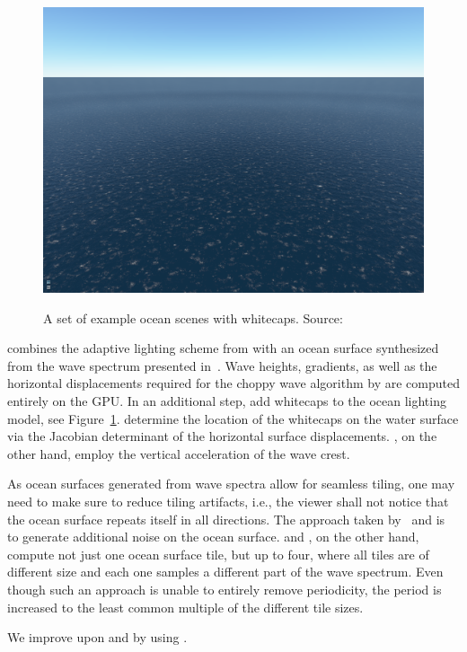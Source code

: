 \begin{figure}
{  \includegraphics[scale=0.125]{figures/Real-time_Animation_and_Rendering_of_Ocean_Whitecaps-004.png}
 }
\caption[Ocean whitecaps by \cite{article:whitecaps}.]{
A set of example ocean scenes with whitecaps. Source:~\cite{article:whitecaps}
}
\label{fig:dupuy:whitecaps}
\end{figure}
%
%
\citet{misc:oceanlightingfft} combines the adaptive lighting scheme
from \citet{article:oceanlighting} with an ocean surface synthesized
from the wave spectrum presented in~\citet{article:Elfouhaily1997}.
Wave heights, gradients, as well as the horizontal displacements
required for the choppy wave algorithm by \citet{course:simulatingocean}
are computed entirely on the GPU. 
\textcolor{changed}{In an additional step,
\citet{article:whitecaps} add whitecaps to the ocean lighting model,
see Figure~\ref{fig:dupuy:whitecaps}. \citeauthor{article:whitecaps}
determine the location of the whitecaps on the water surface
via the Jacobian determinant of the horizontal surface displacements.
\citet{Chen:2017}, on the other hand, employ the vertical acceleration
of the wave crest.}

As ocean surfaces generated from wave spectra allow for seamless tiling,
one may need to make sure to reduce tiling artifacts, i.e., the viewer
shall not notice that the ocean surface repeats itself in all directions.
The approach taken by~\citet{Rydahl:2009} and \citet{NVIDIA:Ocean} is to
generate additional noise on the ocean surface.
\citet{misc:oceanlightingfft} and \citet{article:whitecaps},
on the other hand, compute not just one ocean surface tile, but up to four,
where all tiles are of different size and each one samples a different
part of the wave spectrum. Even though such an approach is unable to
entirely remove periodicity, the period is increased to the least common
multiple of the different tile sizes.

\textcolor{changed}{
We improve upon \citet{misc:oceanlightingfft} and \citet{article:whitecaps}
by using \citet{thesis:johanson}.
}